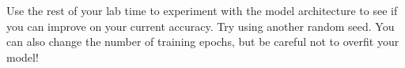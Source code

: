 \documentclass[11pt]{article}
\makeatletter
\newcommand{\boxspacing}{\kern\kvtcb@left@rule\kern\kvtcb@boxsep}
\newcommand{\prompt}[4]{
        {\ttfamily\llap{{\color{#2}[#3]:\hspace{3pt}#4}}\vspace{-\baselineskip}}
    }
\makeatother
\begin{document}
Use the rest of your lab time to experiment with the model architecture
to see if you can improve on your current accuracy. Try using another
random seed. You can also change the number of training epochs, but be
careful not to overfit your model!

    \begin{tcolorbox}[breakable, size=fbox, boxrule=1pt, pad at break*=1mm,colback=cellbackground, colframe=cellborder]
\prompt{In}{incolor}{ }{\boxspacing}
\begin{Verbatim}[commandchars=\\\{\}]

\end{Verbatim}
\end{tcolorbox}

    \begin{tcolorbox}[breakable, size=fbox, boxrule=1pt, pad at break*=1mm,colback=cellbackground, colframe=cellborder]
\prompt{In}{incolor}{ }{\boxspacing}
\begin{Verbatim}[commandchars=\\\{\}]

\end{Verbatim}
\end{tcolorbox}


    
    
    
\end{document}

